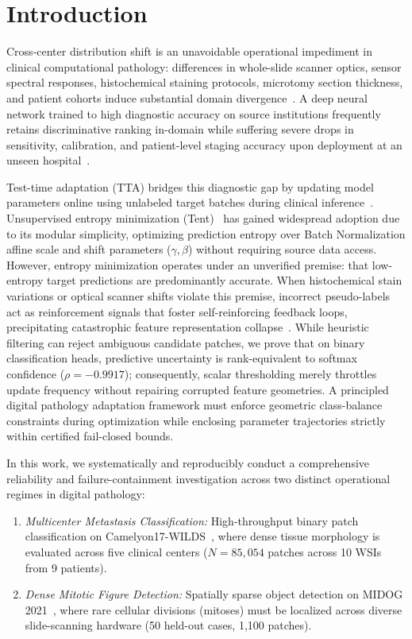 \documentclass[journal]{IEEEtran}
\begin{document}
\section{Introduction}
Cross-center distribution shift is an unavoidable operational impediment in clinical computational pathology: differences in whole-slide scanner optics, sensor spectral responses, histochemical staining protocols, microtomy section thickness, and patient cohorts induce substantial domain divergence~\cite{koh2021wilds,bandi2018camelyon17,aubreville2023mitosis}. A deep neural network trained to high diagnostic accuracy on source institutions frequently retains discriminative ranking in-domain while suffering severe drops in sensitivity, calibration, and patient-level staging accuracy upon deployment at an unseen hospital~\cite{histopathc2026}.

Test-time adaptation (TTA) bridges this diagnostic gap by updating model parameters online using unlabeled target batches during clinical inference~\cite{wang2021tent,liang2023comprehensive}. Unsupervised entropy minimization (Tent)~\cite{wang2021tent} has gained widespread adoption due to its modular simplicity, optimizing prediction entropy over Batch Normalization affine scale and shift parameters ($\gamma, \beta$) without requiring source data access. However, entropy minimization operates under an unverified premise: that low-entropy target predictions are predominantly accurate. When histochemical stain variations or optical scanner shifts violate this premise, incorrect pseudo-labels act as reinforcement signals that foster self-reinforcing feedback loops, precipitating catastrophic feature representation collapse~\cite{histopathc2026}. While heuristic filtering can reject ambiguous candidate patches, we prove that on binary classification heads, predictive uncertainty is rank-equivalent to softmax confidence ($\rho = -0.9917$); consequently, scalar thresholding merely throttles update frequency without repairing corrupted feature geometries. A principled digital pathology adaptation framework must enforce geometric class-balance constraints during optimization while enclosing parameter trajectories strictly within certified fail-closed bounds.

In this work, we systematically and reproducibly conduct a comprehensive reliability and failure-containment investigation across two distinct operational regimes in digital pathology:
\begin{enumerate}\setlength{\itemsep}{1pt}\setlength{\parskip}{0pt}
\item \textit{Multicenter Metastasis Classification:} High-throughput binary patch classification on Camelyon17-WILDS~\cite{koh2021wilds}, where dense tissue morphology is evaluated across five clinical centers ($N=85{,}054$ patches across 10 WSIs from 9 patients).
\item \textit{Dense Mitotic Figure Detection:} Spatially sparse object detection on MIDOG 2021~\cite{aubreville2023mitosis}, where rare cellular divisions (mitoses) must be localized across diverse slide-scanning hardware (50 held-out cases, 1,100 patches).
\end{enumerate}
\end{document}
